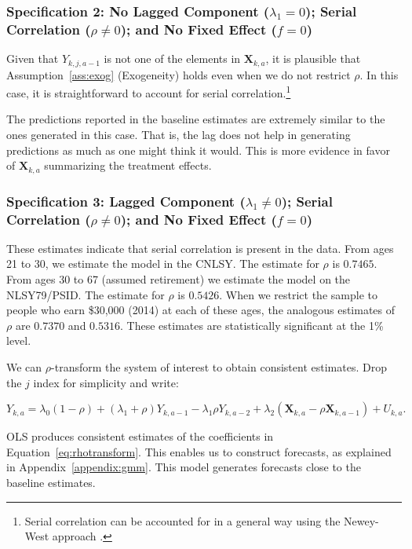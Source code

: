 \subsubsection{Specification 2: No Lagged Component ($\lambda_{1} = 0$); Serial Correlation ($\rho \neq 0$); and No Fixed Effect ($f = 0$)} \label{app:spec2}

Given that $Y_{k,j,a-1}$ is not one of the elements in $\bm{X}_{k,a}$, it is plausible that Assumption~\ref{ass:exog} (Exogeneity) holds even when we do not restrict $\rho$. In this case, it is straightforward to account for serial correlation.\footnote{Serial correlation can be accounted for in a general way using the Newey-West approach \citep{Newey-West_1986_Simple-Pos}.}

The predictions reported in the baseline estimates are extremely similar to the ones generated in this case. That is, the lag does not help in generating predictions as much as one might think it would. This is more evidence in favor of $\bm{X}_{k,a}$ summarizing the treatment effects.

\subsubsection{Specification 3: Lagged Component ($\lambda_{1} \neq 0$); Serial Correlation ($\rho \neq 0$); and No Fixed Effect ($f = 0$)} \label{section:laggedserial}

These estimates indicate that serial correlation is present in the data. From ages 21 to 30, we estimate the model in the CNLSY. The estimate for $\rho$ is $0.7465$. From ages 30 to 67 (assumed retirement) we estimate the model on the NLSY79/PSID. The estimate for $\rho$ is $0.5426$. When we restrict the sample to people who earn \$30,000 (2014) at each of these ages, the analogous estimates of $\rho$ are $0.7370$ and $0.5316$. These estimates are statistically significant at the 1\% level.

We can $\rho$-transform the system of interest to obtain consistent estimates. Drop the $j$ index for simplicity and write:

\begin{equation}
Y_{k,a} = \lambda_{0} \left( 1 - \rho \right) + \left( \lambda_{1} + \rho \right) Y_{k,a-1} - \lambda_{1} \rho Y_{k,a-2} + \lambda_{2} \left( \bm{X}_{k,a} - \rho \bm{X}_{k,a-1}  \right) + U_{k,a}. \label{eq:rhotransform}
\end{equation}

OLS produces consistent estimates of the coefficients in Equation~\eqref{eq:rhotransform}. This enables us to construct forecasts, as explained in Appendix~\ref{appendix:gmm}. This model generates forecasts close to the baseline estimates.

